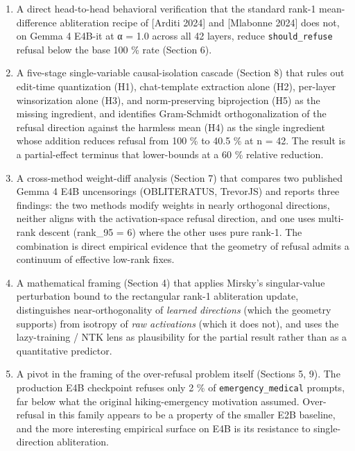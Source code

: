 \documentclass[
  11pt,
]{article}
\providecommand{\tightlist}{%
  \setlength{\itemsep}{0pt}\setlength{\parskip}{0pt}}
\begin{document}
\begin{enumerate}
\def\labelenumi{\arabic{enumi}.}
\tightlist
\item
  A direct head-to-head behavioral verification that the standard rank-1
  mean-difference abliteration recipe of {[}Arditi 2024{]} and
  {[}Mlabonne 2024{]} does not, on Gemma 4 E4B-it at α = 1.0 across all
  42 layers, reduce \texttt{should\_refuse} refusal below the base 100
  \% rate (Section 6).
\item
  A five-stage single-variable causal-isolation cascade (Section 8) that
  rules out edit-time quantization (H1), chat-template extraction alone
  (H2), per-layer winsorization alone (H3), and norm-preserving
  biprojection (H5) as the missing ingredient, and identifies
  Gram-Schmidt orthogonalization of the refusal direction against the
  harmless mean (H4) as the single ingredient whose addition reduces
  refusal from 100 \% to 40.5 \% at n = 42. The result is a
  partial-effect terminus that lower-bounds at a 60 \% relative
  reduction.
\item
  A cross-method weight-diff analysis (Section 7) that compares two
  published Gemma 4 E4B uncensorings (OBLITERATUS, TrevorJS) and reports
  three findings: the two methods modify weights in nearly orthogonal
  directions, neither aligns with the activation-space refusal
  direction, and one uses multi-rank descent (rank\_95 = 6) where the
  other uses pure rank-1. The combination is direct empirical evidence
  that the geometry of refusal admits a continuum of effective low-rank
  fixes.
\item
  A mathematical framing (Section 4) that applies Mirsky's
  singular-value perturbation bound to the rectangular rank-1
  abliteration update, distinguishes near-orthogonality of \emph{learned
  directions} (which the geometry supports) from isotropy of \emph{raw
  activations} (which it does not), and uses the lazy-training / NTK
  lens as plausibility for the partial result rather than as a
  quantitative predictor.
\item
  A pivot in the framing of the over-refusal problem itself (Sections 5,
  9). The production E4B checkpoint refuses only 2 \% of
  \texttt{emergency\_medical} prompts, far below what the original
  hiking-emergency motivation assumed. Over-refusal in this family
  appears to be a property of the smaller E2B baseline, and the more
  interesting empirical surface on E4B is its resistance to
  single-direction abliteration.
\end{enumerate}
\end{document}
